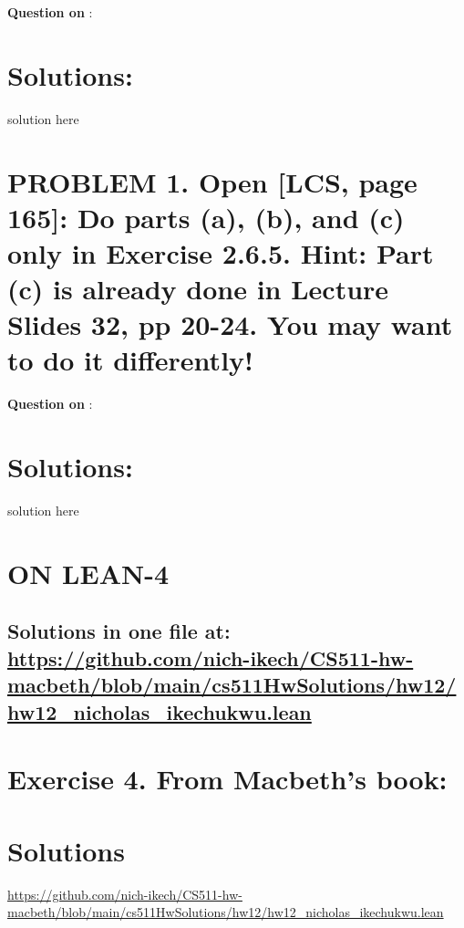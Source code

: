 \documentclass{article}
\begin{document}
\begin{mdframed}
    \vspace{1em}
        \textbf{Question on }: 
    \vspace{1em}
\end{mdframed}
    
\section*{Solutions: }

\vspace{1em}
solution here



\newpage

\section*{PROBLEM 1. Open [LCS, page 165]: Do parts (a), (b), and (c) only in Exercise 2.6.5.
Hint: Part (c) is already done in Lecture Slides 32, pp 20-24. You may want to do it differently! }


\begin{mdframed}
    \vspace{1em}
        \textbf{Question on }: 
    \vspace{1em}
\end{mdframed}
    
\section*{Solutions: }
solution here


\newpage



\section*{ON LEAN-4}
\subsection*{Solutions in one file at: 
\url{https://github.com/nich-ikech/CS511-hw-macbeth/blob/main/cs511HwSolutions/hw12/hw12_nicholas_ikechukwu.lean}}
 
\newpage

\section*{Exercise 4. From Macbeth’s book:}
\section*{Solutions}
\url{https://github.com/nich-ikech/CS511-hw-macbeth/blob/main/cs511HwSolutions/hw12/hw12_nicholas_ikechukwu.lean}
\end{document}
